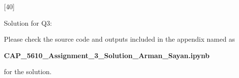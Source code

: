 \documentclass[12pt,letterpaper, onecolumn]{exam}
\begin{document}
\begin{questions}
\begin{parts}
        \begin{solution}

        \end{solution}
        
    \end{parts}

    \pagebreak

    [40]

    Solution for Q3:

    \begin{solution}

        Please check the source code and outputs included in the appendix named as

        \begin{center}
            \textbf{CAP\_5610\_Assignment\_3\_Solution\_Arman\_Sayan.ipynb}
        \end{center}
        
        for the solution.
    \end{solution}

    \pagebreak
    
\end{questions}

%      
\end{document}
